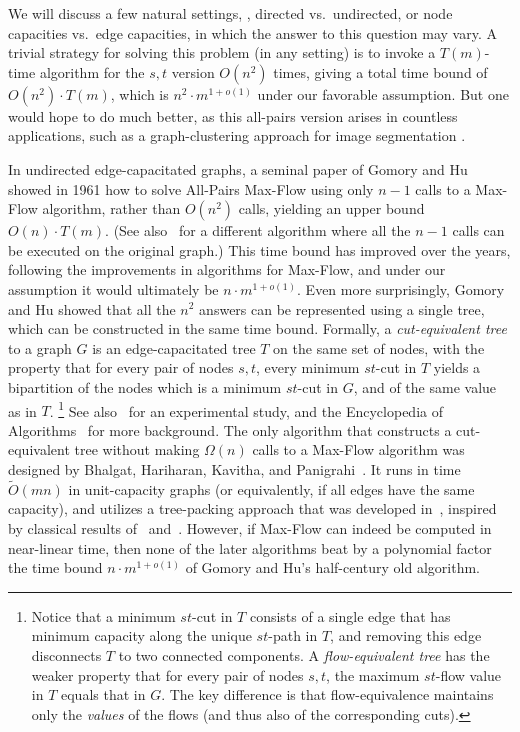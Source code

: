 \documentclass{toc}
\theoremstyle{plain}
\newcommand{\ProblemName}[1]{\textsf{#1}}
\newcommand{\MF}{\ProblemName{Max-Flow}\xspace}
\newcommand{\APMF}{\ProblemName{All-Pairs Max-Flow}\xspace}
\newcommand\tO{\ensuremath{\widetilde O}}  %
\begin{document}
We will discuss a few natural settings,
\eg, directed vs.\ undirected, or node capacities vs.\ edge capacities,
in which the answer to this question may vary.
A trivial strategy for solving this problem (in any setting)
is to invoke a $T(m)$-time algorithm for the $s,t$ version $O(n^2)$ times,
giving a total time bound of $O(n^2)\cdot T(m)$,
which is $n^2 \cdot m^{1+o(1)}$ under our favorable assumption.
But one would hope to do much better,
as this all-pairs version arises in countless applications,
such as a graph-clustering approach for image segmentation \cite{WL93}.


In undirected edge-capacitated graphs,
a seminal paper of Gomory and Hu~\cite{GH61} showed in 1961 how to solve \APMF
using only $n-1$ calls to a \MF algorithm, rather than $O(n^2)$ calls,
yielding an upper bound $O(n) \cdot T(m)$.
(See also~\cite{Gusfield90} for a different algorithm
where all the $n-1$ calls can be executed on the original graph.)
This time bound has improved over the years,
following the improvements in algorithms for \MF,
and under our assumption it would ultimately be $n\cdot m^{1+o(1)}$.
Even more surprisingly, Gomory and Hu showed that all the $n^2$ answers
can be represented using a single tree,
which can be constructed in the same time bound.
Formally,
%
a   %
\emph{cut-equivalent tree} to a graph $G$
is an edge-capacitated tree $T$ on the same set of nodes,
with the property that for every pair of nodes $s,t$,
every minimum $st$-cut in $T$ yields a bipartition of the nodes
which is a minimum $st$-cut in $G$, and of the same value as in $T$.%
\footnote{Notice that a minimum $st$-cut in $T$ consists of a
  single edge that has minimum capacity along the unique $st$-path in $T$,
  and removing this edge disconnects $T$ to two connected components.
  A \emph{flow-equivalent tree} has the weaker property that
  for every pair of nodes $s,t$,
  the maximum $st$-flow value in $T$ equals that in $G$.
  The key difference is that flow-equivalence maintains only the \emph{values}
  of the flows (and thus also of the corresponding cuts).
}
See also~\cite{GT01} for an experimental study,
and the Encyclopedia of Algorithms~\cite{Panigrahi16} for more background.
The only algorithm that constructs a cut-equivalent tree
without making $\Omega(n)$ calls to a \MF algorithm
was designed by Bhalgat, Hariharan, Kavitha, and Panigrahi~\cite{BHKP07}.
It runs in time %
${\tO}(mn)$    %
in unit-capacity graphs
(or equivalently, if all edges have the same capacity),
and utilizes a tree-packing approach that was developed in~\cite{Cole03,HKP07},
inspired by classical results of~\cite{Gabow95} and~\cite{Edmonds70}.
However, if \MF can indeed be computed in near-linear time,
then none of the later algorithms beat by a polynomial factor
the time bound $n\cdot m^{1+o(1)}$ of Gomory and Hu's half-century old algorithm.
\end{document}
